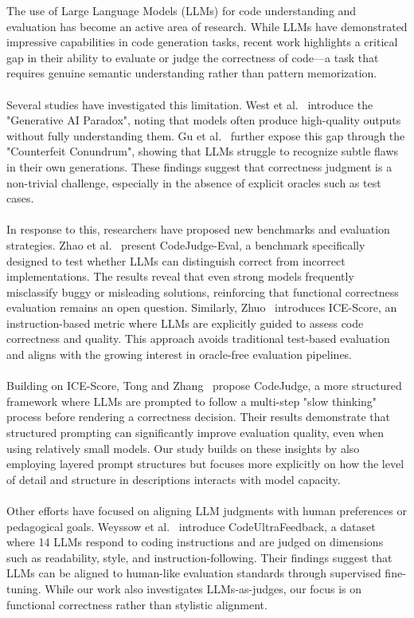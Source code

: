 \documentclass[a4paper]{usiinfbachelorproject}
\begin{document}
The use of Large Language Models (LLMs) for code understanding and evaluation has become an active area of research. While LLMs have demonstrated impressive capabilities in code generation tasks, recent work highlights a critical gap in their ability to evaluate or judge the correctness of code—a task that requires genuine semantic understanding rather than pattern memorization.\\
\\[2pt]
Several studies have investigated this limitation. West et al.~\cite{west2023generative} introduce the "Generative AI Paradox", noting that models often produce high-quality outputs without fully understanding them. Gu et al.~\cite{gu2024counterfeit} further expose this gap through the "Counterfeit Conundrum", showing that LLMs struggle to recognize subtle flaws in their own generations. These findings suggest that correctness judgment is a non-trivial challenge, especially in the absence of explicit oracles such as test cases.\\
\\[2pt]
In response to this, researchers have proposed new benchmarks and evaluation strategies. Zhao et al.~\cite{zhao2024codejudgeeval} present CodeJudge-Eval, a benchmark specifically designed to test whether LLMs can distinguish correct from incorrect implementations. The results reveal that even strong models frequently misclassify buggy or misleading solutions, reinforcing that functional correctness evaluation remains an open question. Similarly, Zhuo~\cite{zhuo2023icescore} introduces ICE-Score, an instruction-based metric where LLMs are explicitly guided to assess code correctness and quality. This approach avoids traditional test-based evaluation and aligns with the growing interest in oracle-free evaluation pipelines.\\
\\[2pt]
Building on ICE-Score, Tong and Zhang~\cite{tong2024codejudge} propose CodeJudge, a more structured framework where LLMs are prompted to follow a multi-step "slow thinking" process before rendering a correctness decision. Their results demonstrate that structured prompting can significantly improve evaluation quality, even when using relatively small models. Our study builds on these insights by also employing layered prompt structures but focuses more explicitly on how the level of detail and structure in descriptions interacts with model capacity.\\
\\[2pt]
Other efforts have focused on aligning LLM judgments with human preferences or pedagogical goals. Weyssow et al.~\cite{weyssow2024codeultrafeedback} introduce CodeUltraFeedback, a dataset where 14 LLMs respond to coding instructions and are judged on dimensions such as readability, style, and instruction-following. Their findings suggest that LLMs can be aligned to human-like evaluation standards through supervised fine-tuning. While our work also investigates LLMs-as-judges, our focus is on functional correctness rather than stylistic alignment.\\
\end{document}
